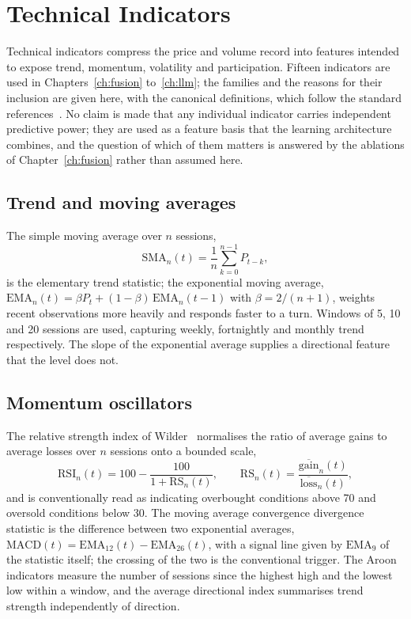 \section{Technical Indicators}

Technical indicators compress the price and volume record into features intended to expose
trend, momentum, volatility and participation. Fifteen indicators are used in
Chapters~\ref{ch:fusion} to~\ref{ch:llm}; the families and the reasons for their inclusion are
given here, with the canonical definitions, which follow the standard
references~\cite{murphy1999,wilder1978,bollinger2001}. No claim is made that any individual
indicator carries independent predictive power; they are used as a feature basis that the
learning architecture combines, and the question of which of them matters is answered by the
ablations of Chapter~\ref{ch:fusion} rather than assumed here.

\subsection{Trend and moving averages}

The simple moving average over $n$ sessions,
\begin{equation}
\mathrm{SMA}_n(t) = \frac{1}{n}\sum_{k=0}^{n-1} P_{t-k},
\end{equation}
is the elementary trend statistic; the exponential moving average,
$\mathrm{EMA}_n(t) = \beta P_t + (1-\beta)\,\mathrm{EMA}_n(t-1)$ with
$\beta = 2/(n+1)$, weights recent observations more heavily and responds faster to a turn.
Windows of 5, 10 and 20 sessions are used, capturing weekly, fortnightly and monthly trend
respectively. The slope of the exponential average supplies a directional feature that the
level does not.

\subsection{Momentum oscillators}

The relative strength index of Wilder~\cite{wilder1978} normalises the ratio of average gains
to average losses over $n$ sessions onto a bounded scale,
\begin{equation}
\mathrm{RSI}_n(t) = 100 - \frac{100}{1 + \mathrm{RS}_n(t)},
\qquad
\mathrm{RS}_n(t) = \frac{\overline{\text{gain}}_n(t)}{\overline{\text{loss}}_n(t)},
\end{equation}
and is conventionally read as indicating overbought conditions above 70 and oversold conditions
below 30. The moving average convergence divergence statistic is the difference between two
exponential averages, $\mathrm{MACD}(t) = \mathrm{EMA}_{12}(t) - \mathrm{EMA}_{26}(t)$, with a
signal line given by $\mathrm{EMA}_{9}$ of the statistic itself; the crossing of the two is the
conventional trigger. The Aroon indicators measure the number of sessions since the highest
high and the lowest low within a window, and the average directional index summarises trend
strength independently of direction.

